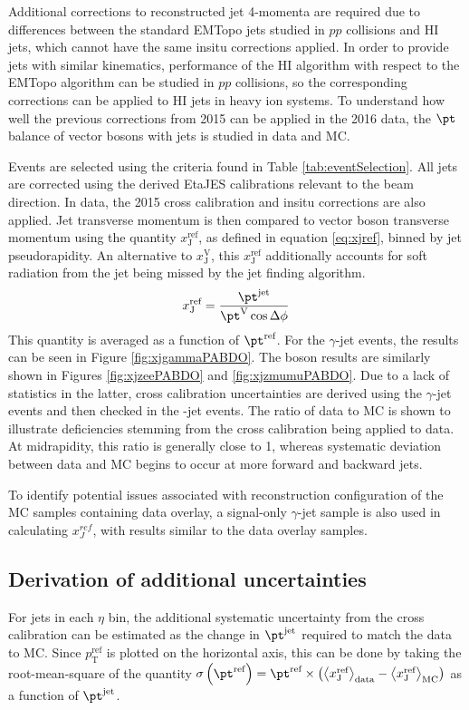 \documentclass[NOTE, atlasdraft=true, texlive=2016, USenglish]{\ATLASLATEXPATH atlasdoc}
\begin{document}
Additional corrections to reconstructed jet 4-momenta are required due to differences between the standard EMTopo jets studied in $pp$ collisions and HI jets, which cannot have the same insitu corrections applied. In order to provide jets with similar kinematics, performance of the HI algorithm with respect to the EMTopo algorithm can be studied in $pp$ collisions, so the corresponding corrections can be applied to HI jets in heavy ion systems. To understand how well the previous corrections from 2015 can be applied in the 2016 data, the $\pt$ balance of vector bosons with jets is studied in data and MC.\par
Events are selected using the criteria found in Table \ref{tab:eventSelection}. All jets are corrected using the derived EtaJES calibrations relevant to the beam direction. In data, the 2015 cross calibration and insitu corrections are also applied. Jet transverse momentum is then compared to vector boson transverse momentum using the quantity $x_{\text{J}}^{\text{ref}}$, as defined in equation \ref{eq:xjref}, binned by jet pseudorapidity. An alternative to $x_{\text{J}}^{\text{V}}$, this $x_{\text{J}}^{\text{ref}}$ additionally accounts for soft radiation from the jet being missed by the jet finding algorithm.
\begin{equation}
	x_{\text{J}}^{\text{ref}} = \frac{\pt^{\text{jet}}}{\pt^{\text{V}} \cos{\Delta\phi}}
	\label{eq:xjref}
\end{equation}
This quantity is averaged as a function of $\pt^{\text{ref}}$. For the $\gamma$-jet events, the results can be seen in Figure \ref{fig:xjgammaPABDO}. The \Zboson boson results are similarly shown in Figures \ref{fig:xjzeePABDO} and \ref{fig:xjzmumuPABDO}. Due to a lack of statistics in the latter, cross calibration uncertainties are derived using the $\gamma$-jet events and then checked in the \Zboson-jet events. The ratio of data to MC is shown to illustrate deficiencies stemming from the cross calibration being applied to data. At midrapidity, this ratio is generally close to 1, whereas systematic deviation between data and MC begins to occur at more forward and backward jets.\par
To identify potential issues associated with reconstruction configuration of the MC samples containing data overlay, a signal-only $\gamma$-jet sample is also used in calculating $x_J^{ref}$, with results similar to the data overlay samples.

\subsection{Derivation of additional uncertainties}
For jets in each $\eta$ bin, the additional systematic uncertainty from the cross calibration can be estimated as the change in $\pt^{\text{jet}}$ required to match the data to MC. Since $p_{\text{T}}^{\text{ref}}$ is plotted on the horizontal axis, this can be done by taking the root-mean-square of the quantity $\sigma \left(\pt^{\text{ref}}\right) = \pt^{\text{ref}} \times\left( \left< x_{\text{J}}^{\text{ref}} \right>_{\text{data}} - \left< x_{\text{J}}^{\text{ref}} \right>_{\text{MC}} \right)$ as a function of $\pt^{\text{jet}}$.
\end{document}
